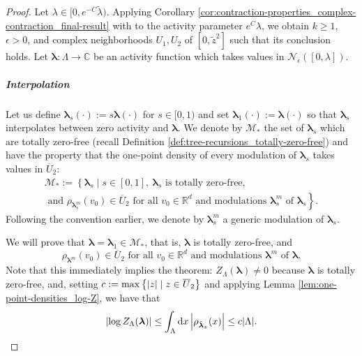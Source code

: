 \documentclass[11pt]{article}
\newcommand{\R}{\mathbb R}
\newcommand{\C}{\mathbb C}
\newcommand{\bl}{\bm{\lambda}}
\newcommand{\tz}{\tilde{z}}
\newcommand{\lsconst}{C}
\newcommand{\set}[1]{\left\{#1\right\}}
\numberwithin{equation}{section}
\theoremstyle{plain}
\theoremstyle{definition}
\theoremstyle{remark}
\begin{document}
\begin{proof}
Let $\lambda\in[0,e^{-\lsconst}\tilde{\lambda})$.
Applying Corollary \ref{cor:contraction-properties_complex-contraction_final-result} with to the activity parameter $e^{\lsconst}\lambda$, we obtain $k\ge 1$, $\epsilon>0$, and complex neighborhoods $U_{1},U_{2}$ of $[0,\tz^{2}]$ such that its conclusion holds.
Let $\bl:\Lambda\rightarrow\C$ be an activity function which takes values in $\mathcal{N}_{\epsilon}([0,\lambda])$.

\subparagraph{Interpolation}

Let us define $\bl_{s}(\cdot):=s\bl(\cdot)$ for $s\in[0,1)$ and set $\bl_{1}(\cdot):=\bl(\cdot)$ so that $\bl_{s}$ interpolates between zero activity and $\bl$.
We denote by $\mathcal{M}_{\ast}$ the set of $\bl_{s}$ which are totally zero-free (recall Definition \ref{def:tree-recursions_totally-zero-free}) and have the property that the one-point density of every modulation of $\bl_{s}$ takes values in $\overline{U}_{2}$:
\begin{equation}
\begin{multlined}
\mathcal{M}_{\ast}:=\left\{\bl_{s}\mid s\in[0,1],\ \bl_{s}\text{ is totally zero-free,}\right.
\\
\left.\text{ and }\rho_{\bl_{s}^{m}}(v_{0})\in\overline{U}_{2}\text{ for all }v_{0}\in\R^{d}\text{ and modulations }\bl_{s}^{m}\text{ of }\bl_{s}\right\}.
\end{multlined}
\end{equation}
Following the convention earlier, we denote by $\bl_{s}^{m}$ a generic modulation of $\bl_{s}$.

We will prove that $\bl=\bl_{1}\in\mathcal{M}_{\ast}$, that is, $\bl$ is totally zero-free, and
\begin{equation}
\label{eqn:zero-freeness_property}
\rho_{\bl^{m}}(v_{0})\in\overline{U}_{2}\text{ for all }v_{0}\in\R^{d}\text{ and modulations }\bl^{m}\text{ of }\bl.
\end{equation}
Note that this immediately implies the theorem: $Z_{\Lambda}(\bl)\ne 0$ because $\bl$ is totally zero-free, and, setting $c:=\max\set{\abs{z}\mid z\in\overline{U}_{2}}$ and applying Lemma \ref{lem:one-point-densities_log-Z}, we have that
\begin{equation}
\label{eqn:zero-freeness_desired-bound}
\abs{\log Z_{\Lambda}(\bl)}\le\int_{\Lambda}\dd{x}\abs{\rho_{\hat{\bl}_{x}}(x)}\le c\abs{\Lambda}.
\end{equation} 


\end{proof}
\end{document}
